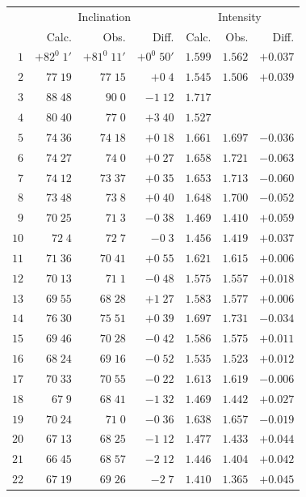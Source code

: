 \clearpage
{}
\begingroup
\fontsize{9}{10.2}\selectfont
\setlength{\tabcolsep}{2.5pt}
\renewcommand{\arraystretch}{1.02}
\begin{center}
\begin{tabular}{r||r|r|r||r|r|r}
\hline
&\multicolumn{3}{c||}{Inclination}&\multicolumn{3}{c}{Intensity}\\
&Calc.&Obs.&Diff.&Calc.&Obs.&Diff.\\\hline
$1$&$+82^0\;1'$&$+81^0\;11'$&$+0^0\;50'$&$1.599$&$1.562$&$+0.037$\\
$2$&$77\;19$&$77\;15$&$+0\;4$&$1.545$&$1.506$&$+0.039$\\
$3$&$88\;48$&$90\;0$&$-1\;12$&$1.717$&&\\
$4$&$80\;40$&$77\;0$&$+3\;40$&$1.527$&&\\
$5$&$74\;36$&$74\;18$&$+0\;18$&$1.661$&$1.697$&$-0.036$\\
$6$&$74\;27$&$74\;0$&$+0\;27$&$1.658$&$1.721$&$-0.063$\\
$7$&$74\;12$&$73\;37$&$+0\;35$&$1.653$&$1.713$&$-0.060$\\
$8$&$73\;48$&$73\;8$&$+0\;40$&$1.648$&$1.700$&$-0.052$\\
$9$&$70\;25$&$71\;3$&$-0\;38$&$1.469$&$1.410$&$+0.059$\\
$10$&$72\;4$&$72\;7$&$-0\;3$&$1.456$&$1.419$&$+0.037$\\[2pt]
$11$&$71\;36$&$70\;41$&$+0\;55$&$1.621$&$1.615$&$+0.006$\\
$12$&$70\;13$&$71\;1$&$-0\;48$&$1.575$&$1.557$&$+0.018$\\
$13$&$69\;55$&$68\;28$&$+1\;27$&$1.583$&$1.577$&$+0.006$\\
$14$&$76\;30$&$75\;51$&$+0\;39$&$1.697$&$1.731$&$-0.034$\\
$15$&$69\;46$&$70\;28$&$-0\;42$&$1.586$&$1.575$&$+0.011$\\
$16$&$68\;24$&$69\;16$&$-0\;52$&$1.535$&$1.523$&$+0.012$\\
$17$&$70\;33$&$70\;55$&$-0\;22$&$1.613$&$1.619$&$-0.006$\\
$18$&$67\;9$&$68\;41$&$-1\;32$&$1.469$&$1.442$&$+0.027$\\
$19$&$70\;24$&$71\;0$&$-0\;36$&$1.638$&$1.657$&$-0.019$\\
$20$&$67\;13$&$68\;25$&$-1\;12$&$1.477$&$1.433$&$+0.044$\\[2pt]
$21$&$66\;45$&$68\;57$&$-2\;12$&$1.446$&$1.404$&$+0.042$\\
$22$&$67\;19$&$69\;26$&$-2\;7$&$1.410$&$1.365$&$+0.045$\\

\end{tabular}
\end{center}
